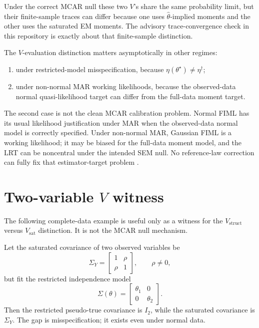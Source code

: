 \documentclass[11pt]{article}
\begin{document}
Under the correct MCAR null these two \(V\)'s share the same probability
limit, but their finite-sample traces can differ because one uses
\(\hat\theta\)-implied moments and the other uses the saturated EM moments.
The advisory trace-convergence check in this repository is exactly about that
finite-sample distinction.

The \(V\)-evaluation distinction matters asymptotically in other regimes:
\begin{enumerate}
  \item under restricted-model misspecification, because
        \(\eta(\theta^\star)\ne\eta^\dagger\);
  \item under non-normal MAR working likelihoods, because the observed-data
        normal quasi-likelihood target can differ from the full-data moment
        target.
\end{enumerate}
The second case is not the clean MCAR calibration problem. Normal FIML has its
usual likelihood justification under MAR when the observed-data normal model
is correctly specified. Under non-normal MAR, Gaussian FIML is a working
likelihood; it may be biased for the full-data moment model, and the LRT can
be noncentral under the intended SEM null. No reference-law correction can
fully fix that estimator-target problem
\cite{yuanbentler2000,savalei2010}.

\section*{Two-variable \(V\) witness}

The following complete-data example is useful only as a witness for the
\(V_{\mathrm{struct}}\) versus \(V_{\mathrm{sat}}\) distinction. It is not the
MCAR null mechanism.

Let the saturated covariance of two observed variables be
\[
  \Sigma_Y =
  \begin{bmatrix}
    1 & \rho \\
    \rho & 1
  \end{bmatrix},
  \qquad \rho \ne 0,
\]
but fit the restricted independence model
\[
  \Sigma(\theta) =
  \begin{bmatrix}
    \theta_1 & 0 \\
    0 & \theta_2
  \end{bmatrix}.
\]
Then the restricted pseudo-true covariance is \(I_2\), while the saturated
covariance is \(\Sigma_Y\). The gap is misspecification; it exists even under
normal data.
\end{document}
